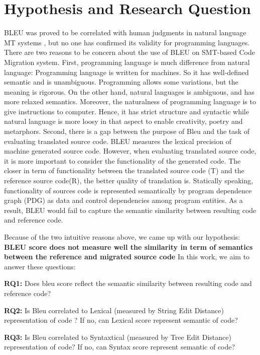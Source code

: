 \section{Hypothesis and Research Question}
BLEU was proved to be correlated with human judgments in natural language MT systems \cite {Papineni02}, but no one has confirmed its validity for programming languages. There are two reasons to be concern about the use of BLEU on SMT-based Code Migration system. First, programming language is much difference from natural language: Programming language is written for machines. So it has well-defined semantic and is unambiguous. Programming allows some variations, but the meaning is rigorous. On the other hand, natural languages is ambiguous, and has more relaxed semantics. Moreover, the naturalness of programming language is to give instructions to computer. Hence, it has strict structure and syntactic while natural language is more loosy in that aspect to enable creativity, poetry and metarphors. Second, there is a gap between the purpose of Bleu and the task of evaluating translated source code. BLEU measures the lexical precision of machine generated source code. However, when evaluating translated source code, it is more important to consider the functionality of the generated code. The closer in term of functionality between the translated source code (T) and the reference source code(R), the better quality of translation is. Statically speaking, functionality of sources code is represented semantically by program dependence
graph (PDG) as data and control dependencies among program entities. As a result, BLEU would fail to capture the semantic similarity between resulting code and reference code.

Because of the two intuitive reasons above, we came up with our hypothesis: 
\textbf{ BLEU score does not measure well the similarity in term of semantics between the reference and migrated source code }
In this work, we aim to answer these questions:

\textbf{RQ1: }
Does bleu score reflect the semantic similarity between resulting code and reference code?

\textbf{RQ2: } 
Is Bleu correlated to Lexical (measured by String Edit Distance) representation of code ? If no, can Lexical score represent semantic of code?

\textbf{RQ3: } 
Is Bleu correlated to Syntaxtical (measured by Tree Edit Distance)  representation of code? If no, can Syntax score represent semantic of code?
